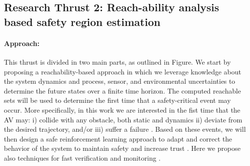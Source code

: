 
\subsection{Research Thrust 2: Reach-ability analysis based safety region estimation}
\label{sec:reachability}




\paragraph{Approach:} 
 This thrust is divided in two main parts, as outlined in Figure. We start by proposing a reachability-based approach in which we leverage knowledge about the system dynamics and process, sensor, and environmental uncertainties to determine the future states over a finite time horizon. The computed reachable sets will be used to determine the first time that a safety-critical event may occur. 
More specifically, in this work we are interested in the fist time that the AV may: i) collide with any obstacle, both static and dynamics ii) deviate from the desired trajectory, and/or iii) suffer a failure . Based on these events, we will then design a safe reinforcement learning approach to adapt and correct the behavior of the system to maintain safety and increase trust . Here we propose also techniques for fast verification and monitoring .

%


